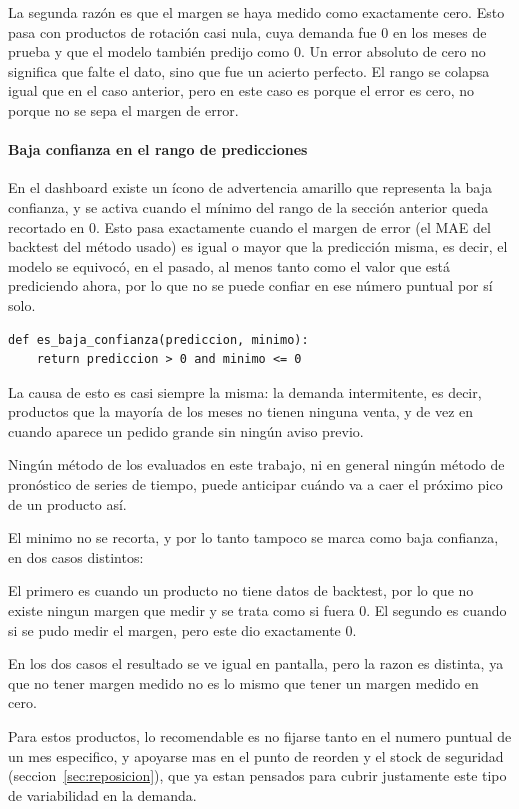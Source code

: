 La segunda razón es que el margen se haya medido como exactamente cero. Esto pasa con productos de rotación casi nula, cuya demanda fue 0 en los meses de prueba y que el modelo también predijo como 0. Un error absoluto de cero no significa que falte el dato, sino que fue un acierto perfecto. El rango se colapsa igual que en el caso anterior, pero en este caso es porque el error es cero, no porque no se sepa el margen de error.

\paragraph{Baja confianza en el rango de predicciones}\label{sec:rango-predicciones}

En el dashboard existe un ícono de advertencia amarillo que representa la baja confianza, y se activa cuando el mínimo del rango de la sección anterior queda recortado en 0. Esto pasa exactamente cuando el margen de error (el MAE del backtest del método usado) es igual o mayor que la predicción misma, es decir, el modelo se equivocó, en el pasado, al menos tanto como el valor que está prediciendo ahora, por lo que no se puede confiar en ese número puntual por sí solo.

\label{lst:es_baja_confianza}
\begin{verbatim}
def es_baja_confianza(prediccion, minimo):
    return prediccion > 0 and minimo <= 0
\end{verbatim}

La causa de esto es casi siempre la misma: la demanda intermitente, es decir, productos que la mayoría de los meses no tienen ninguna venta, y de vez en cuando aparece un pedido grande sin ningún aviso previo.

Ningún método de los evaluados en este trabajo, ni en general ningún método de pronóstico de series de tiempo, puede anticipar cuándo va a caer el próximo pico de un producto así. 

El minimo no se recorta, y por lo tanto tampoco se marca como baja confianza, en dos casos distintos:

El primero es cuando un producto no tiene datos de backtest, por lo que no existe ningun margen que medir y se trata como si fuera 0. El segundo es cuando si se pudo medir el margen, pero este dio exactamente 0.

En los dos casos el resultado se ve igual en pantalla, pero la razon es distinta, ya que no tener margen medido no es lo mismo que tener un margen medido en cero.

Para estos productos, lo recomendable es no fijarse tanto en el numero puntual de un mes especifico, y apoyarse mas en el punto de reorden y el stock de seguridad (seccion~\ref{sec:reposicion}), que ya estan pensados para cubrir justamente este tipo de variabilidad en la demanda.
